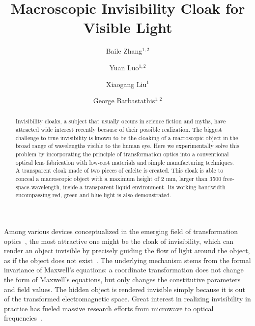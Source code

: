 \documentclass[preprint,preprintnumbers,amsmath,amssymb]{revtex4}
\begin{document}

\title{Macroscopic Invisibility Cloak for Visible Light}

\author{Baile Zhang$^{1,2}$}
\author{Yuan Luo$^{1,2}$}
\author{Xiaogang Liu$^1$}
\author{George Barbastathis$^{1,2}$}
 




\begin{abstract}
Invisibility cloaks, a subject that usually occurs in science
fiction and myths, have attracted wide interest recently because of
their possible realization. The biggest challenge to true
invisibility is known to be the cloaking of a macroscopic object in
the broad range of wavelengths visible to the human eye. Here we
experimentally solve this problem by incorporating the principle of
transformation optics into a conventional optical lens fabrication
with low-cost materials and simple manufacturing techniques. A
transparent cloak made of two pieces of calcite is created. This
cloak is able to conceal a macroscopic object with a maximum height
of 2 mm, larger than 3500 free-space-wavelength, inside a
transparent liquid environment. Its working bandwidth encompassing
red, green and blue light is also demonstrated.
\end{abstract}

\maketitle

Among various devices conceptualized in the emerging field of
transformation optics~\cite{huanyang_review}, the most attractive
one  might be the cloak of invisibility, which can render an object
invisible by precisely guiding the flow of light around the object,
as if the object does not
exist~\cite{leonhardt,pendry,leonhardt_broad,li_carpet}. The
underlying mechanism stems from the formal invariance of Maxwell's
equations: a coordinate transformation does not change the form of
Maxwell's equations, but only changes the constitutive parameters
and field values. The hidden object is rendered invisible simply
because it is out of the transformed electromagnetic space. Great
interest in realizing invisibility in practice has fueled massive
research efforts from microwave to optical
frequencies~\cite{schurig,smolyaninov_SPP,ruopeng,valentine,gabrielli,park,smolyaninov_waveguide,huifeng,ergin}.
\end{document}
